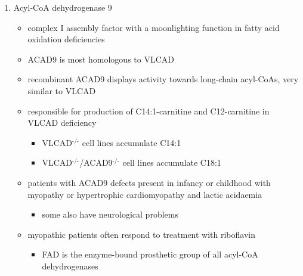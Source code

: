 \documentclass{scrartcl}
\begin{document}
\begin{enumerate}
\item Acyl-CoA dehydrogenase 9
\label{sec:orga71ed4a}
\begin{itemize}
\item complex I assembly factor with a moonlighting function in fatty
acid oxidation deficiencies
\item ACAD9 is most homologous to VLCAD
\item recombinant ACAD9 displays activity towards long-chain acyl-CoAs,
very similar to VLCAD
\item responsible for production of C14:1-carnitine and C12-carnitine in
VLCAD deficiency
\begin{itemize}
\item VLCAD\(^{\text{-/-}}\) cell lines accumulate C14:1
\item VLCAD\(^{\text{-/-}}\)/ACAD9\(^{\text{-/-}}\) cell lines accumulate C18:1
\end{itemize}
\item patients with ACAD9 defects present in infancy or childhood with
myopathy or hypertrophic cardiomyopathy and lactic acidaemia
\begin{itemize}
\item some also have neurological problems
\end{itemize}
\item myopathic patients often respond to treatment with riboflavin
\begin{itemize}
\item FAD is the enzyme-bound prosthetic group of all acyl-CoA
dehydrogenases
\end{itemize}
\end{itemize}
\end{enumerate}
\end{document}
